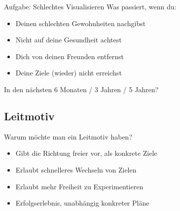 \begin{frame}[c]{Aufgabe: Schlechtes Visualisieren}
    Was passiert, wenn du:
    \begin{itemize}[<+(1)->]
        \item Deinen schlechten Gewohnheiten nachgibst
        \item Nicht auf deine Gesundheit achtest
        \item Dich von deinen Freunden entfernst
        \item Deine Ziele (wieder) nicht erreichst
    \end{itemize}
    \pause
    In den nächsten 6 Monaten / 3 Jahren / 5 Jahren?

\end{frame}






\subsection{Leitmotiv}

\begin{frame}[c]{Warum möchte man ein Leitmotiv haben?}
    \large
    \begin{itemize}[<+(1)->]
        \item Gibt die Richtung freier vor, als konkrete Ziele
        \item Erlaubt schnelleres Wechseln von Zielen
        \item Erlaubt mehr Freiheit zu Experimentieren
        \item Erfolgserlebnis, unabhängig konkreter Pläne
    \end{itemize}
\end{frame}


